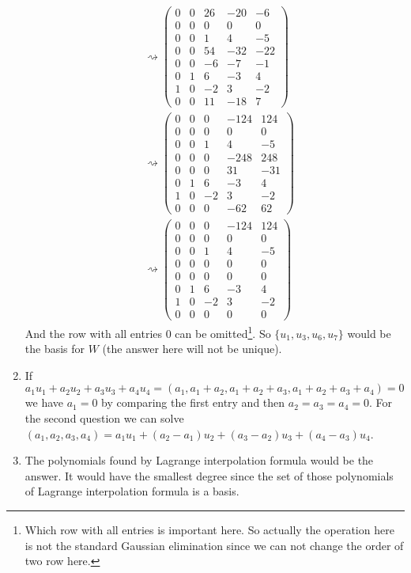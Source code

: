 \begin{enumerate}
\begin{align*}
&\rightsquigarrow \left( \begin{array}{ccccc}0&0&26&-20&-6\\0&0&0&0&0\\0&0&1&4&-5\\0&0&54&-32&-22\\0&0&-6&-7&-1\\0&1&6&-3&4\\1&0&-2&3&-2\\0&0&11&-18&7\end{array}\right)\\
&\rightsquigarrow \left( \begin{array}{ccccc}0&0&0&-124&124\\0&0&0&0&0\\0&0&1&4&-5\\0&0&0&-248&248\\0&0&0&31&-31\\0&1&6&-3&4\\1&0&-2&3&-2\\0&0&0&-62&62\end{array}\right)\\
&\rightsquigarrow \left( \begin{array}{ccccc}0&0&0&-124&124\\0&0&0&0&0\\0&0&1&4&-5\\0&0&0&0&0\\0&0&0&0&0\\0&1&6&-3&4\\1&0&-2&3&-2\\0&0&0&0&0\end{array}\right)
\end{align*}
And the row with all entries $0$ can be omitted\footnote{Which row with all entries is important here. So actually the operation here is not the standard Gaussian elimination since we can not change the order of two row here.}. So $\{u_1,u_3,u_6,u_7\}$ would be the basis for $W$ (the answer here will not be unique).
\item If $a_1u_1+a_2u_2+a_3u_3+a_4u_4=(a_1,a_1+a_2,a_1+a_2+a_3,a_1+a_2+a_3+a_4)=0$ we have $a_1=0$ by comparing the first entry and then $a_2=a_3=a_4=0$. For the second question we can solve $(a_1,a_2,a_3,a_4)=a_1u_1+(a_2-a_1)u_2+(a_3-a_2)u_3+(a_4-a_3)u_4$.
\item The polynomials found by Lagrange interpolation formula would be the answer. It would have the smallest degree since the set of those polynomials of Lagrange interpolation formula is a basis.


\end{enumerate}
